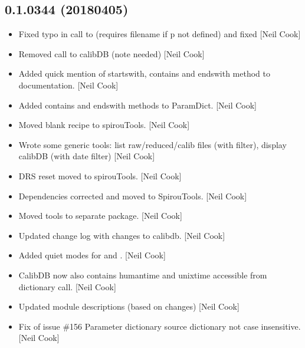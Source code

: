 \documentclass[a4paper,10pt,english]{report}
\begin{document}
\subsection{0.1.0344 (2018\sphinxhyphen{}04\sphinxhyphen{}05)}
\label{\detokenize{misc/changelog:id487}}\begin{itemize}
\item {} 
Fixed typo in call to  (requires filename if p not
defined) and fixed  {[}Neil Cook{]}

\item {} 
Removed call to calibDB (note needed) {[}Neil Cook{]}

\item {} 
Added quick mention of startswith, contains and endswith method to
documentation. {[}Neil Cook{]}

\item {} 
Added contains and endswith methods to ParamDict. {[}Neil Cook{]}

\item {} 
Moved blank recipe to spirouTools. {[}Neil Cook{]}

\item {} 
Wrote some generic tools: list raw/reduced/calib files (with filter),
display calibDB (with date filter) {[}Neil Cook{]}

\item {} 
DRS reset moved to spirouTools. {[}Neil Cook{]}

\item {} 
Dependencies corrected and moved to SpirouTools. {[}Neil Cook{]}

\item {} 
Moved tools to separate package. {[}Neil Cook{]}

\item {} 
Updated change log with changes to calibdb. {[}Neil Cook{]}

\item {} 
Added quiet modes for  and . {[}Neil Cook{]}

\item {} 
CalibDB now also contains humantime and unixtime accessible from
dictionary call. {[}Neil Cook{]}

\item {} 
Updated module descriptions (based on changes) {[}Neil Cook{]}

\item {} 
Fix of issue \#156 \sphinxhyphen{} Parameter dictionary source dictionary not case
insensitive. {[}Neil Cook{]}


\end{itemize}
\end{document}
